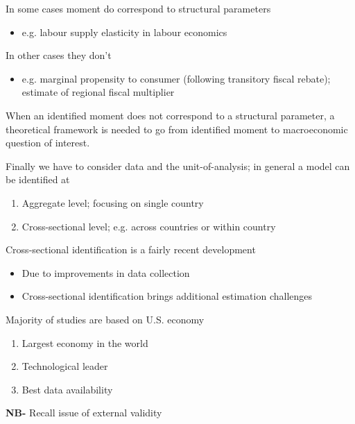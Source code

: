 \documentclass{beamer}
\begin{document}
\begin{frame}
  In some cases moment do correspond to structural parameters
  \begin{itemize}
    \item e.g. labour supply elasticity in labour economics
  \end{itemize}
  \medskip
  In other cases they don't
  \begin{itemize}
    \item e.g. marginal propensity to consumer (following transitory fiscal rebate); estimate of regional fiscal multiplier
  \end{itemize}
  \medskip
  When an identified moment does not correspond to a structural parameter, a theoretical framework is needed to go from identified moment to macroeconomic question of interest.
\end{frame}

\begin{frame}
 Finally we have to consider data and the unit-of-analysis; in general a model can be identified at 
 \medskip 
  \begin{enumerate}
    \item Aggregate level; focusing on single country
    \item Cross-sectional level; e.g. across countries or within country
  \end{enumerate}
  \medskip
  Cross-sectional identification is a fairly recent development
  \begin{itemize}
    \item Due to improvements in data collection
    \item Cross-sectional identification brings additional estimation challenges
  \end{itemize}
\end{frame}

\begin{frame}
 Majority of studies are based on U.S. economy
 \medskip
 \begin{enumerate}
   \item Largest economy in the world
   \item Technological leader
   \item Best data availability
 \end{enumerate}
 \medskip
 \textbf{NB-} Recall issue of external validity
\end{frame}
\end{document}
